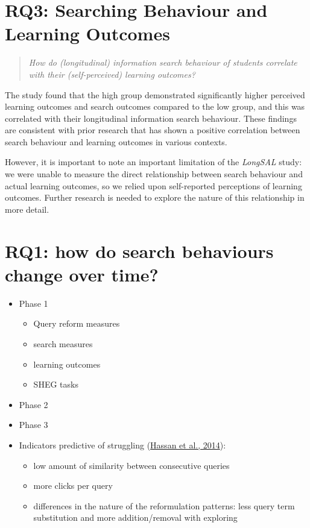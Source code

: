 \documentclass[letterpaper, nobind]{templates/ociamthesis}
\providecommand{\tightlist}{%
  \setlength{\itemsep}{0pt}\setlength{\parskip}{0pt}}
\begin{document}
\hypertarget{rq3-searching-behaviour-and-learning-outcomes}{%
\section{RQ3: Searching Behaviour and Learning Outcomes}\label{rq3-searching-behaviour-and-learning-outcomes}}

\begin{quote}
\emph{How do (longitudinal) information search behaviour of students correlate with their (self-perceived) learning outcomes?}
\end{quote}

The study found that the high group demonstrated significantly higher perceived learning outcomes and search outcomes compared to the low group, and this was correlated with their longitudinal information search behaviour. These findings are consistent with prior research that has shown a positive correlation between search behaviour and learning outcomes in various contexts.

However, it is important to note an important limitation of the \emph{LongSAL} study: we were unable to measure the direct relationship between search behaviour and actual learning outcomes, so we relied upon self-reported perceptions of learning outcomes.
Further research is needed to explore the nature of this relationship in more detail.

\hypertarget{rq1-how-do-search-behaviours-change-over-time}{%
\section{RQ1: how do search behaviours change over time?}\label{rq1-how-do-search-behaviours-change-over-time}}

\begin{itemize}
\item
  Phase 1

  \begin{itemize}
  \tightlist
  \item
    Query reform measures
  \item
    search measures
  \item
    learning outcomes
  \item
    SHEG tasks
  \end{itemize}
\item
  Phase 2
\item
  Phase 3
\item
  Indicators predictive of struggling (\protect\hyperlink{ref-hassan2014struggling}{Hassan et al., 2014}):

  \begin{itemize}
  \tightlist
  \item
    low amount of similarity between consecutive queries
  \item
    more clicks per query
  \item
    differences in the nature of the reformulation patterns: less query term substitution and more addition/removal with exploring
  \end{itemize}
\end{itemize}
\end{document}
